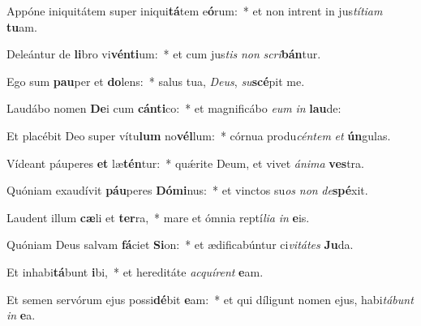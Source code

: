 \item Appóne iniquitátem super iniqui\textbf{tá}tem e\textbf{ó}rum:~* et non intrent in jus\textit{tí}\textit{ti}\textit{am} \textbf{tu}am.
\item Deleántur de \textbf{li}bro vi\textbf{vén}\textbf{ti}um:~* et cum jus\textit{tis} \textit{non} \textit{scri}\textbf{bán}tur.
\item Ego sum \textbf{pau}per et \textbf{do}lens:~* salus tua, \textit{De}\textit{us}, \textit{su}\textbf{scé}pit me.
\item Laudábo nomen \textbf{De}i cum \textbf{cán}\textbf{ti}co:~* et magnificábo \textit{e}\textit{um} \textit{in} \textbf{lau}de:
\item Et placébit Deo super vítu\textbf{lum} no\textbf{vél}lum:~* córnua produ\textit{cén}\textit{tem} \textit{et} \textbf{ún}gulas.
\item Vídeant páuperes \textbf{et} læ\textbf{tén}tur:~* quǽrite Deum, et vivet \textit{á}\textit{ni}\textit{ma} \textbf{ves}tra.
\item Quóniam exaudívit \textbf{páu}peres \textbf{Dó}\textbf{mi}nus:~* et vinctos su\textit{os} \textit{non} \textit{de}\textbf{spé}xit.
\item Laudent illum \textbf{cæ}li et \textbf{ter}ra,~* mare et ómnia reptí\textit{li}\textit{a} \textit{in} \textbf{e}is.
\item Quóniam Deus salvam \textbf{fá}ciet \textbf{Si}on:~* et ædificabúntur ci\textit{vi}\textit{tá}\textit{tes} \textbf{Ju}da.
\item Et inhabi\textbf{tá}bunt \textbf{i}bi,~* et hereditáte \textit{ac}\textit{quí}\textit{rent} \textbf{e}am.
\item Et semen servórum ejus possi\textbf{dé}bit \textbf{e}am:~* et qui díligunt nomen ejus, habi\textit{tá}\textit{bunt} \textit{in} \textbf{e}a.
